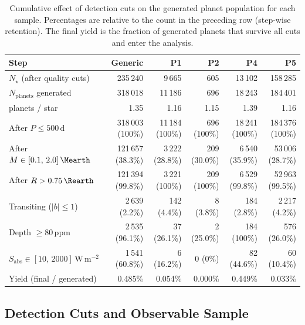 \begin{table}[H]
    \centering
    \caption[Planet detection cuts per \PLATO sample]{%
        Cumulative effect of detection cuts on the generated planet
        population for each sample.  Percentages are relative to the
        count in the preceding row (step-wise retention).
        The final yield is the fraction of generated planets that survive
        all cuts and enter the \HZIED analysis.}
    \label{tab:planet_cuts}
    \setlength{\tabcolsep}{5pt}
    \small
    \begin{tabular}{lrrrrr}
        \toprule
        Step & Generic & P1 & P2 & P4 & P5 \\
        \midrule
        $N_\star$ (after quality cuts)
            & 235\,240 & 9\,665 & 605 & 13\,102 & 158\,285 \\
        $N_\mathrm{planets}$ generated
            & 318\,018 & 11\,186 & 696 & 18\,243 & 184\,401 \\
        \quad planets / star
            & 1.35 & 1.16 & 1.15 & 1.39 & 1.16 \\
        \midrule
        After $P \leq 500\,\mathrm{d}$
            & 318\,003 (100\%) & 11\,184 (100\%) & 696 (100\%)
            & 18\,241 (100\%) & 184\,376 (100\%) \\
        After $M \in [0.1,\,2.0]\,\Mearth$
            & 121\,657 (38.3\%) & 3\,222 (28.8\%) & 209 (30.0\%)
            & 6\,540 (35.9\%) & 53\,006 (28.7\%) \\
        After $R > 0.75\,\Rearth$
            & 121\,394 (99.8\%) & 3\,221 (100\%) & 209 (100\%)
            & 6\,529 (99.8\%) & 52\,963 (99.5\%) \\
        Transiting ($|b| \leq 1$)
            & 2\,639 (2.2\%) & 142 (4.4\%) & 8 (3.8\%)
            & 184 (2.8\%) & 2\,217 (4.2\%) \\
        Depth $\geq 80\,\mathrm{ppm}$
            & 2\,535 (96.1\%) & 37 (26.1\%) & 2 (25.0\%)
            & 184 (100\%) & 576 (26.0\%) \\
        $S_\mathrm{abs} \in [10,\,2000]\,\mathrm{W\,m^{-2}}$
            & 1\,541 (60.8\%) & 6 (16.2\%) & 0 (0\%)
            & 82 (44.6\%) & 60 (10.4\%) \\
        \midrule
        Yield (final / generated)
            & 0.485\% & 0.054\% & 0.000\% & 0.449\% & 0.033\% \\
        \bottomrule
    \end{tabular}
\end{table}

\subsection{Detection Cuts and Observable Sample}
\label{ssec:detection_cuts}

